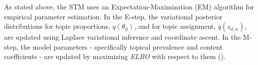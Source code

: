 As stated above, the STM uses an Expectation-Maximization (EM) algorithm for empirical parameter estimation. In the E-step, the variational posterior distributions for topic proportions, $q(\theta_d)$, and for topic assignment, $q(z_{d,n})$, are updated using Laplace variational inference and coordinate ascent. In the M-step, the model parameters - specifically topical prevalence and content coefficients - are updated by maximizing \textit{ELBO} with respect to them (\citealp{roberts2016model}).
